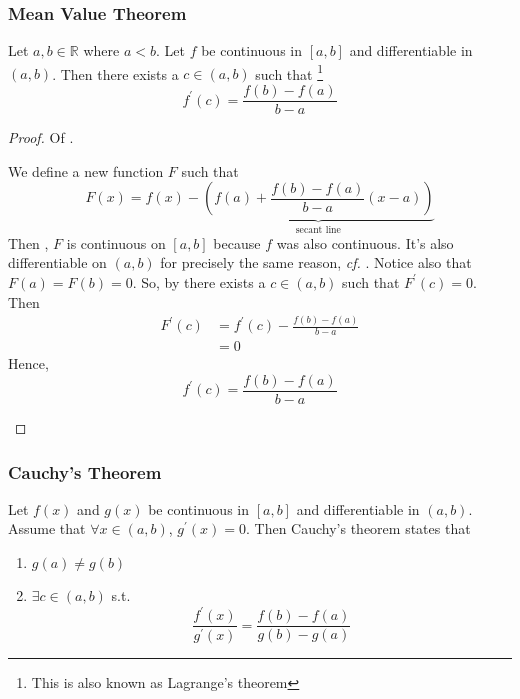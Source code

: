 \subsubsection{Mean Value Theorem}\label{subsubsec-mean-value-theorem}

\begin{thm}\label{thm-mean-value-theorem}
	Let $a,b\in\mathbb{R}$ where $a<b$. Let $f$ be continuous in $[a,b]$ and
	differentiable in $(a,b)$. Then there exists a $c\in(a,b)$ such that
	\footnote{This is also known as Lagrange's theorem}
	\begin{equation}
		f^\prime(c)=\frac{f(b)-f(a)}{b-a}
	\end{equation}
\end{thm}

\begin{proof}
	Of .
	\begin{flushleft}
		We define a new function $F$ such that
		\begin{equation*}
			F(x)=f(x)-\underbrace{\left(f(a)+\frac{f(b)-f(a)}{b-a}(x-a)\right)}_{\text{secant line}}
		\end{equation*}
		Then , $F$ is continuous on $[a,b]$
		because $f$ was also continuous. It's also differentiable on $(a,b)$ for
		precisely the same reason, \textit{cf.} .
		Notice also that $F(a)=F(b)=0$. So, by  there
		exists a $c\in(a,b)$ such that $F^\prime(c)=0$. Then
		\begin{align*}
			F^\prime(c) & = f^\prime(c) - \frac{f(b)-f(a)}{b-a} \\
			            & = 0
		\end{align*}
		Hence,
		\begin{equation*}
			f^\prime(c)=\frac{f(b)-f(a)}{b-a}
		\end{equation*}
	\end{flushleft}
\end{proof}

\subsubsection{Cauchy's Theorem}\label{subsubsec-cauchys-theorem}

\begin{thm}\label{thm-cauchys-theorem}
	Let $f(x)$ and $g(x)$ be continuous in $[a,b]$ and differentiable in $(a,b)$.
	Assume that $\forall x\in(a,b)$, $g^\prime(x)=0$. Then Cauchy's theorem states
	that
	\begin{enumerate}
		\item $g(a)\neq g(b)$
		\item $\exists c\in(a,b)$ s.t.
		      \begin{equation}
			      \frac{f^\prime(x)}{g^\prime(x)}=\frac{f(b)-f(a)}{g(b)-g(a)}
		      \end{equation}
	\end{enumerate}
\end{thm}

